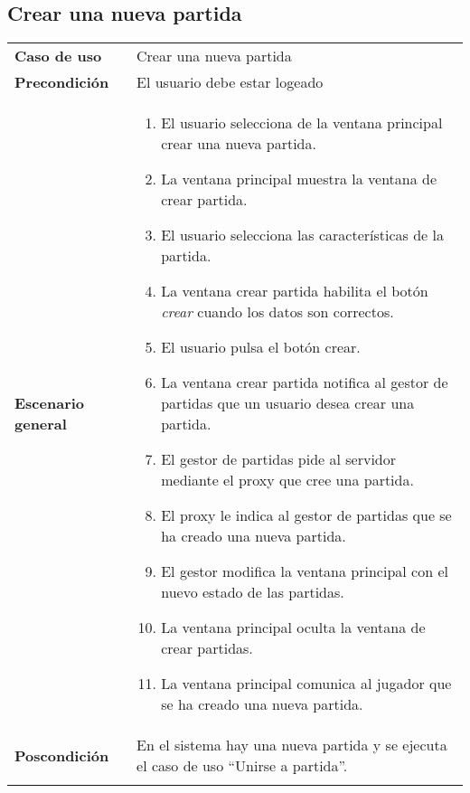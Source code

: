 \subsection{Crear una nueva partida}
{\footnotesize
\begin{tabularx}{0.95\textwidth}{p{}|X}

\textbf{Caso de uso} & Crear una nueva partida \\

\textbf{Precondición} & El usuario debe estar logeado \\

\textbf{Escenario general} & \begin{enumerate}
\item El usuario selecciona de la ventana principal crear una nueva partida.
\item La ventana principal muestra la ventana de crear partida.
\item El usuario selecciona las características de la partida.
\item La ventana crear partida habilita el botón \emph{crear} cuando los datos
son correctos.
\item El usuario pulsa el botón crear.
\item La ventana crear partida notifica al gestor de partidas que un usuario
desea crear una partida.
\item El gestor de partidas pide al servidor mediante el proxy que cree una
partida.
\item El proxy le indica al gestor de partidas que se ha creado una nueva
partida.
\item El gestor modifica la ventana principal con el nuevo estado de las
partidas.
\item La ventana principal oculta la ventana de crear partidas.
\item La ventana principal comunica al jugador que se ha creado una nueva
partida.
\end{enumerate} \\

\textbf{Poscondición} & En el sistema hay una nueva partida y se ejecuta el caso
 de uso ``Unirse a partida''.\\ \\


\end{tabularx}}
